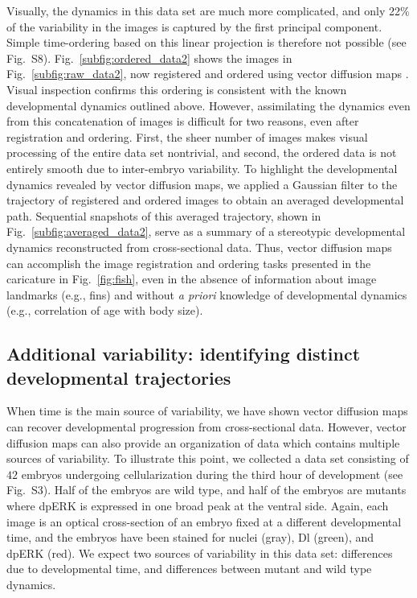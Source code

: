 \documentclass{pnastwo}
\newcommand{\fig}[0]{Fig.}
\begin{document}
\begin{article}
Visually, the dynamics in this data set are much more complicated, and only 22\% of the variability in the images is captured by the first principal component.
%
Simple time-ordering based on this linear projection is therefore not possible (see \fig~S8).
%
%
\fig~\ref{subfig:ordered_data2} shows the images in \fig~\ref{subfig:raw_data2}, now registered and ordered using vector diffusion maps \cite{singer2012vector}.
%
Visual inspection confirms this ordering is consistent with the known developmental dynamics outlined above.
%
However, assimilating the dynamics even from this concatenation of images is difficult for two reasons, even after registration and ordering.
%
First, the sheer number of images makes visual processing of the entire data set nontrivial, and
second, the ordered data is not entirely smooth due to inter-embryo variability.
%
To highlight the developmental dynamics revealed by vector diffusion maps, we applied a Gaussian filter to the trajectory of registered and ordered images to obtain an averaged developmental path.  
%
Sequential snapshots of this averaged trajectory, shown in \fig~\ref{subfig:averaged_data2}, serve as a summary of a stereotypic developmental dynamics reconstructed from cross-sectional data.
%
Thus, vector diffusion maps can accomplish the image registration and ordering tasks presented in the caricature in \fig~\ref{fig:fish}, even in the absence of information about image landmarks (e.g., fins) and without {\it a priori} knowledge of developmental dynamics (e.g., correlation of age with body size).



\subsection{Additional variability: identifying distinct developmental trajectories}

When time is the main source of variability, we have shown vector diffusion maps can recover developmental progression from cross-sectional data.
%
However, vector diffusion maps can also provide an organization of data which contains multiple sources of variability.
%
To illustrate this point, we collected a data set consisting of $42$ embryos undergoing cellularization during the third hour of development (see \fig~S3).
%
Half of the embryos are wild type, and half of the embryos are mutants where dpERK is expressed in one broad peak at the ventral side.
%
Again, each image is an optical cross-section of an embryo fixed at a different developmental time, and the embryos have been stained for nuclei (gray), Dl (green), and dpERK (red).
%
We expect two sources of variability in this data set: differences due to developmental time, and differences between mutant and wild type dynamics.





\end{article}
\end{document}
